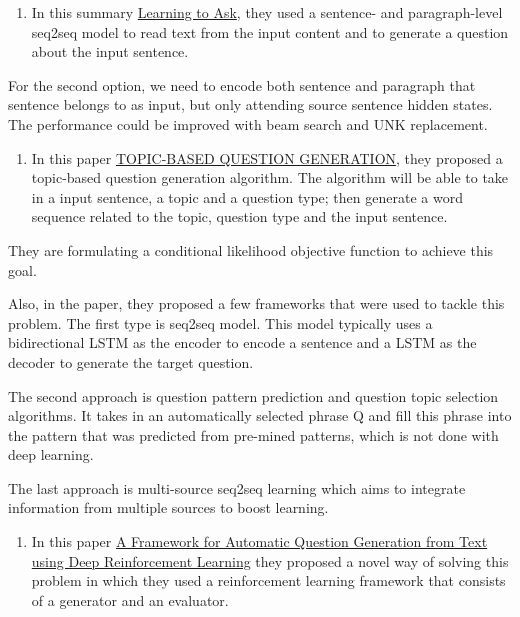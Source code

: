 \documentclass[]{book}
\providecommand{\tightlist}{%
  \setlength{\itemsep}{0pt}\setlength{\parskip}{0pt}}
\theoremstyle{definition}
\theoremstyle{definition}
\theoremstyle{definition}
\theoremstyle{remark}
\begin{document}
\begin{enumerate}
\def\labelenumi{\arabic{enumi}.}
\setcounter{enumi}{1}
\tightlist
\item
  In this summary
  \href{http://www.cs.cornell.edu/~xdu/papers/acl17_dsc_poster.pdf}{Learning
  to Ask}, they used a sentence- and paragraph-level seq2seq model to
  read text from the input content and to generate a question about the
  input sentence.
\end{enumerate}

For the second option, we need to encode both sentence and paragraph
that sentence belongs to as input, but only attending source sentence
hidden states. The performance could be improved with beam search and
UNK replacement.

\begin{enumerate}
\def\labelenumi{\arabic{enumi}.}
\setcounter{enumi}{2}
\tightlist
\item
  In this paper
  \href{https://openreview.net/pdf?id=rk3pnae0b}{TOPIC-BASED QUESTION
  GENERATION}, they proposed a topic-based question generation
  algorithm. The algorithm will be able to take in a input sentence, a
  topic and a question type; then generate a word sequence related to
  the topic, question type and the input sentence.
\end{enumerate}

They are formulating a conditional likelihood objective function to
achieve this goal.

Also, in the paper, they proposed a few frameworks that were used to
tackle this problem. The first type is seq2seq model. This model
typically uses a bidirectional LSTM as the encoder to encode a sentence
and a LSTM as the decoder to generate the target question.

The second approach is question pattern prediction and question topic
selection algorithms. It takes in an automatically selected phrase Q and
fill this phrase into the pattern that was predicted from pre-mined
patterns, which is not done with deep learning.

The last approach is multi-source seq2seq learning which aims to
integrate information from multiple sources to boost learning.

\begin{enumerate}
\def\labelenumi{\arabic{enumi}.}
\setcounter{enumi}{3}
\tightlist
\item
  In this paper \href{https://arxiv.org/pdf/1808.04961.pdf}{A Framework
  for Automatic Question Generation from Text using Deep Reinforcement
  Learning} they proposed a novel way of solving this problem in which
  they used a reinforcement learning framework that consists of a
  generator and an evaluator.
\end{enumerate}
\end{document}

